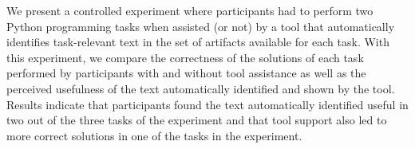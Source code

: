 We present a controlled experiment where participants had to 
perform two Python programming tasks when assisted (or not) by a tool that automatically identifies task-relevant text 
in the set of artifacts available for each task. 
With this experiment, we compare the correctness of the solutions of each task 
performed by participants with and without tool assistance
as well as the perceived usefulness of the text automatically identified and shown by the tool. 
Results indicate that participants found the text automatically identified
useful in two out of the three tasks of the experiment
and that tool support also led to more correct solutions 
in one of the tasks in the experiment.









